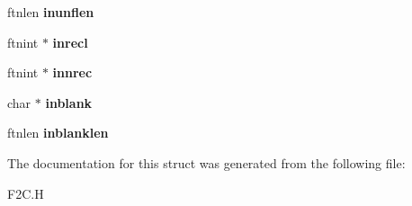 \begin{DoxyCompactItemize}
\item 
\hypertarget{structinlist_a4a5e555086d129a2b8edc7d2ff3b3725}{ftnlen {\bfseries inunflen}}\label{structinlist_a4a5e555086d129a2b8edc7d2ff3b3725}

\item 
\hypertarget{structinlist_ad11fedcf60bcfb643548dc8992f8774c}{ftnint $\ast$ {\bfseries inrecl}}\label{structinlist_ad11fedcf60bcfb643548dc8992f8774c}

\item 
\hypertarget{structinlist_a0d5491f5ed82c5e4f787ac0411fd7600}{ftnint $\ast$ {\bfseries innrec}}\label{structinlist_a0d5491f5ed82c5e4f787ac0411fd7600}

\item 
\hypertarget{structinlist_a3cbc44275b6c1cab2d1aad14af0b3318}{char $\ast$ {\bfseries inblank}}\label{structinlist_a3cbc44275b6c1cab2d1aad14af0b3318}

\item 
\hypertarget{structinlist_a2aec2496017c66c3ba0d96adcb2b37a0}{ftnlen {\bfseries inblanklen}}\label{structinlist_a2aec2496017c66c3ba0d96adcb2b37a0}

\end{DoxyCompactItemize}


The documentation for this struct was generated from the following file\+:\begin{DoxyCompactItemize}
\item 
F2\+C.\+H\end{DoxyCompactItemize}
